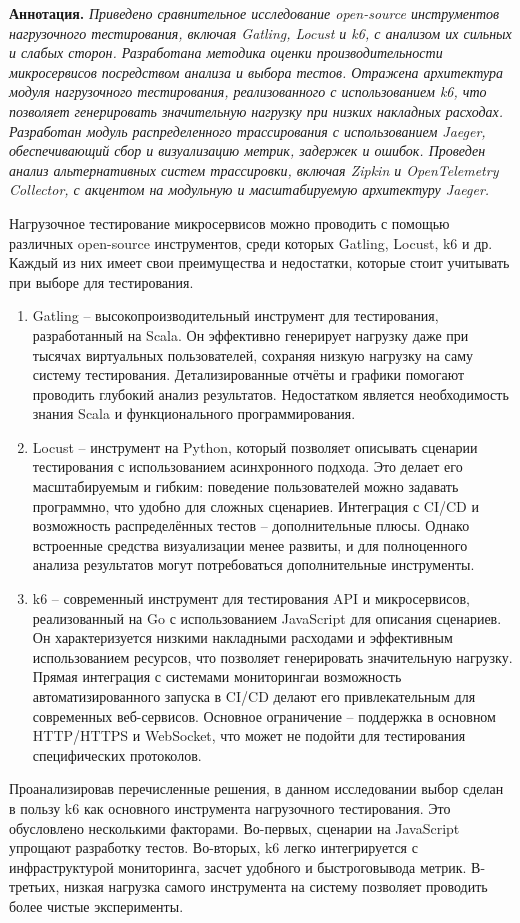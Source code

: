 \textbf{Аннотация. }\textit{Приведено сравнительное исследование open-source инструментов нагрузочного тестирования, включая Gatling, Locust и k6, с анализом их сильных и слабых сторон. Разработана методика оценки производительности микросервисов посредством анализа и выбора тестов. Отражена архитектура модуля нагрузочного тестирования, реализованного с использованием k6, что позволяет генерировать значительную нагрузку при низких накладных расходах. Разработан модуль распределенного трассирования с использованием Jaeger, обеспечивающий сбор и визуализацию метрик, задержек и ошибок. Проведен анализ альтернативных систем трассировки, включая Zipkin и OpenTelemetry Collector, с акцентом на модульную и масштабируемую архитектуру Jaeger.}


Нагрузочное тестирование микросервисов можно проводить с помощью различных open-source инструментов, среди которых Gatling, Locust, k6 и др. Каждый из них имеет свои преимущества и недостатки, которые стоит учитывать при выборе для тестирования.
\begin{enumerate}
\item Gatling – высокопроизводительный инструмент для тестирования, разработанный на Scala. Он эффективно генерирует нагрузку даже при тысячах виртуальных пользователей, сохраняя низкую нагрузку на саму систему тестирования. Детализированные отчёты и графики помогают проводить глубокий анализ результатов. Недостатком является необходимость знания Scala и функционального программирования.

\item Locust – инструмент на Python, который позволяет описывать сценарии тестирования с использованием асинхронного подхода. Это делает его масштабируемым и гибким: поведение пользователей можно задавать программно, что удобно для сложных сценариев. Интеграция с CI/CD и возможность распределённых тестов – дополнительные плюсы. Однако встроенные средства визуализации менее развиты, и для полноценного анализа результатов могут потребоваться дополнительные инструменты.

\item k6 – современный инструмент для тестирования API и микросервисов, реализованный на Go с использованием JavaScript для описания сценариев. Он характеризуется низкими накладными расходами и эффективным использованием ресурсов, что позволяет генерировать значительную нагрузку. Прямая интеграция с системами мониторингаи возможность автоматизированного запуска в CI/CD делают его привлекательным для современных веб-сервисов. Основное ограничение – поддержка в основном HTTP/HTTPS и WebSocket, что может не подойти для тестирования специфических протоколов.
\end{enumerate}
Проанализировав перечисленные решения, в данном исследовании выбор сделан в пользу k6 как основного инструмента нагрузочного тестирования. Это обусловлено несколькими факторами. Во-первых, сценарии на JavaScript упрощают разработку тестов. Во-вторых, k6 легко интегрируется с инфраструктурой мониторинга, засчет удобного и быстроговывода метрик. В-третьих, низкая нагрузка самого инструмента на систему позволяет проводить более чистые эксперименты.


